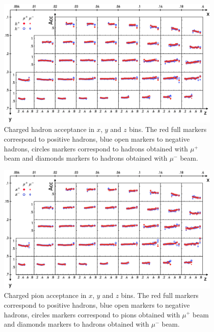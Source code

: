 \begin{figure}
  \centering
	\includegraphics[scale=0.7]{./gfx/AccH.png}
	\caption{Charged hadron acceptance in $x$, $y$ and $z$ bins. The red full markers correspond to positive hadrons, blue open markers to negative hadrons, circles markers correspond to hadrons obtained with $\mu^+$ beam and diamonds markers to hadrons obtained with $\mu^-$ beam.}
	\label{pic:AccH}
\end{figure}

\begin{figure}
  \centering
	\includegraphics[scale=0.7]{./gfx/AccPi.png}
	\caption{Charged pion acceptance in $x$, $y$ and $z$ bins. The red full markers correspond to positive hadrons, blue open markers to negative hadrons, circles markers correspond to pions obtained with $\mu^+$ beam and diamonds markers to hadrons obtained with $\mu^-$ beam.}
	\label{pic:AccPi}
\end{figure}

